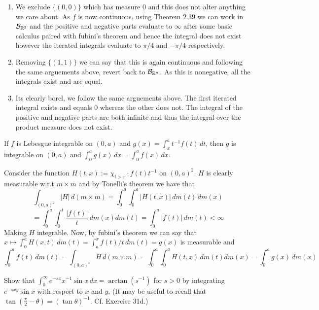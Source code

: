 \documentclass[12pt,a4paper]{article}
\begin{document}
\begin{solution}
    \begin{enumerate}[label=\alph*.]
		\item We exclude $\{(0,0)\}$ which has measure $0$ and this does not alter anything we care about. 
			As $f$ is now continuous, using Theorem $2.39$ we can work in $\mathcal B_{\mathbb{R}^2}$ and the positive and negative parts evaluate to $\infty$ after some basic calculus paired with fubini's theorem and hence the integral does not exist however the iterated integrals evaluate  to $\pi/4$ and $-\pi/4$ respectively. 
		\item Removing $\{(1,1)\}$ we can say that this is again continuous and following the same arguements above, revert back to $\mathcal B_{\mathbb{R}^n}$. 
			As this is nonegative, all the integrals exist and are equal.
		\item Its clearly borel, we follow the same arguements above. The first iterated integral exists and equals $0$ whereas the other does not. 
			The integral of the positive and negative parts are both infinite and thus the integral over the product measure does not exist.
    \end{enumerate}
\end{solution}
\begin{problem}\label{prob:2-56}
If $f$ is Lebesgue integrable on $(0, a)$ and $g(x) = \int_x^a t^{-1} f(t) \, dt$, then $g$ is integrable on $(0, a)$ and $\int_0^a g(x) \, dx = \int_0^a f(x) \, dx$.
\end{problem}
\begin{solution}
	Consider the function $H(t,x) := \chi_{t>x}\cdot f(t)t^{-1}$ on $(0,a)^2$. 
	$H$ is clearly measurable w.r.t $m\times m$ and by Tonelli's theorem we have that
	\[
		\int_{(0,a)^2}|H|\,d(m\times m)=\int_0^a\int_0^a|H(t,x)|\,dm(t)\,dm(x)
	\]
	\[
		=\int_0^a\int_0^t \frac{|f(t)|}{t}\,dm(x)dm(t)=\int_0^a|f(t)|\,dm(t)<\infty
	\]
	Making $H$ integrable. 
	Now, by fubini's theorem we can say that $x\mapsto\int_0^aH(x,t)\,dm(t)=\int_a^xf(t)/t\,dm(t)=g(x)$ is measurable and 
	\[
	\int_0^af(t)\,dm(t)=\int_{(0,a)^s}H\,d(m\times m)=\int_0^a\int_0^aH(t,x)\,dm(t)dm(x)=\int_0^ag(x)\,dm(x)
	\]	
\end{solution}
\begin{problem}\label{prob:2-57}
Show that $\int_0^\infty e^{-sx} x^{-1} \sin x \, dx = \arctan(s^{-1})$ for $s > 0$ by integrating $e^{-sxy} \sin x$ with respect to $x$ and $y$. (It may be useful to recall that $\tan(\frac{\pi}{2} - \theta) = (\tan \theta)^{-1}$. Cf. Exercise 31d.)
\end{problem}
\end{document}
